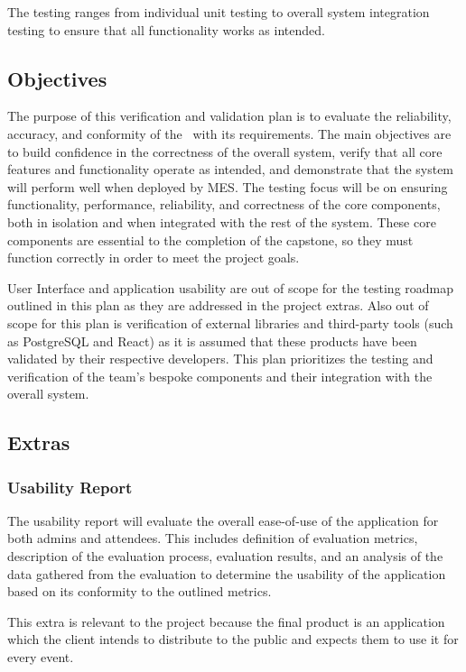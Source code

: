 \documentclass[12pt, titlepage]{article}
\begin{document}
\noindent The testing ranges from individual unit testing to overall system integration testing to ensure that all functionality
works as intended.
\subsection{Objectives}

The purpose of this verification and validation plan is to evaluate the reliability, accuracy, and conformity of the
\teamname~with its requirements. The main objectives are to build confidence in the correctness of the overall system,
verify that all core features and functionality operate as intended, and demonstrate that the system will perform well
when deployed by MES. The testing focus will be on ensuring functionality, performance, reliability, and correctness of
the core components, both in isolation and when integrated with the rest of the system. These core components are
essential to the completion of the capstone, so they must function correctly in order to meet the project goals.

User Interface and application usability are out of scope for the testing roadmap outlined in this plan as they are
addressed in the project extras. Also out of scope for this plan is verification of external libraries and third-party
tools (such as PostgreSQL and React) as it is assumed that these products have been validated by their respective
developers. This plan prioritizes the testing and verification of the team's bespoke components and their integration
with the overall system.

\subsection{Extras}

\subsubsection{Usability Report}
The usability report will evaluate the overall ease-of-use of the application for both admins and attendees. This
includes definition of evaluation metrics, description of the evaluation process, evaluation results, and an analysis of
the data gathered from the evaluation to determine the usability of the application based on its conformity to the
outlined metrics.

This extra is relevant to the project because the final product is an application which the client
intends to distribute to the public and expects them to use it for every event.
\end{document}

